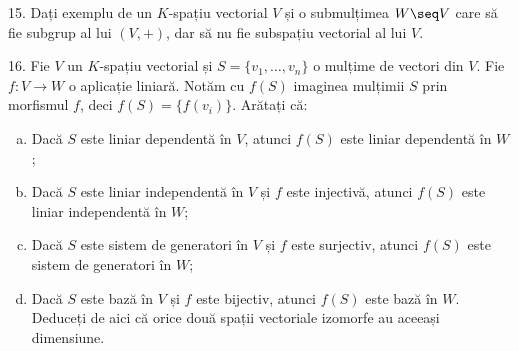 \vspace{1cm}

15. Dați exemplu de un $K$-spațiu vectorial $V$ și o submulțimea $W \seq V$
care să fie subgrup al lui $(V, +)$, dar să nu fie subspațiu vectorial al lui $V$.

\vspace{1cm}

16. Fie $V$ un $K$-spațiu vectorial și $S = \{v_1, \dots, v_n\}$ o mulțime
de vectori din $V$. Fie $f : V \to W$ o aplicație liniară. Notăm cu $f(S)$
imaginea mulțimii $S$ prin morfismul $f$, deci $f(S) = \{ f(v_i) \}$.
Arătați că:
\begin{enumerate}[(a)]
\item Dacă $S$ este liniar dependentă în $V$, atunci $f(S)$ este liniar dependentă
  în $W$;
\item Dacă $S$ este liniar independentă în $V$ și $f$ este injectivă, atunci
  $f(S)$ este liniar independentă în $W$;
\item Dacă $S$ este sistem de generatori în $V$ și $f$ este surjectiv, atunci
  $f(S)$ este sistem de generatori în $W$;
\item Dacă $S$ este bază în $V$ și $f$ este bijectiv, atunci $f(S)$ este
  bază în $W$. Deduceți de aici că orice două spații vectoriale izomorfe
  au aceeași dimensiune.
\end{enumerate}

